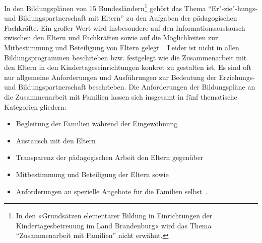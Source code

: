 \documentclass[12pt,a4paper]{article}
\begin{document}
In den Bildungsplänen von 15 Bundesländern\footnote{In den »Grundsätzen elementarer Bildung in Einrichtungen der Kindertagesbetreuung im Land Brandenburg« wird das Thema "`Zusammenarbeit mit Familien"' nicht erwähnt.} gehört das Thema "`Er"-zie"-hungs- und Bildungspartnerschaft mit Eltern"' zu den Aufgaben der pädagogischen Fachkräfte. Ein großer Wert wird insbesondere auf den Informationsaustausch zwischen den Eltern und Fachkräften sowie auf die Möglichkeiten zur Mitbestimmung und Beteiligung von Eltern gelegt~\parencite[S.~39]{Viernickel_2009}. Leider ist nicht in allen Bildungsprogrammen beschrieben bzw. festgelegt wie die Zusammenarbeit mit den Eltern in den Kindertageseinrichtungen konkret zu gestalten ist. Es sind oft nur allgemeine Anforderungen und Ausführungen zur Bedeutung der Erziehungs- und Bildungspartnerschaft beschrieben. Die Anforderungen der Bildungspläne an die Zusammenarbeit mit Familien lassen sich insgesamt in fünf thematische Kategorien gliedern:
\begin{itemize}
\item Begleitung der Familien während der Eingewöhnung
\item Austausch mit den Eltern  
\item Transparenz der  pädagogischen Arbeit den Eltern gegenüber
\item Mitbestimmung und Beteiligung der Eltern sowie
\item Anforderungen an spezielle Angebote für die Familien selbst~\parencite[S.~38]{Viernickel_2009}.
\end{itemize}
		
\end{document}
